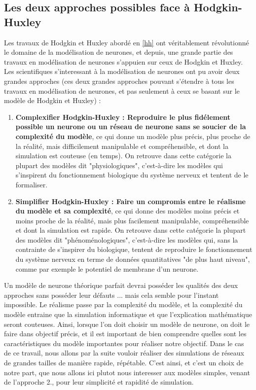 \documentclass[12pt]{scrartcl}
\begin{document}
\subsection{Les deux approches possibles face à Hodgkin-Huxley}
	Les travaux de Hodgkin et Huxley abordé en \ref{hh} ont véritablement révolutionné le domaine de la modélisation de neurones, et depuis, une grande partie des travaux en modélisation de neurones s'appuien sur ceux de Hodgkin et Huxley. Les scientifiques s'interessant  à la modélisation de neurones ont pu avoir deux grandes approches (ces deux grandes approches pouvant s'étendre à tous les travaux en modélisation de neurones, et pas seulement à ceux se basant sur le modèle de Hodgkin et Huxley) : 
		\begin{enumerate} \item \textbf{Complexifier Hodgkin-Huxley : Reproduire le plus fidélement possible un neurone ou un réseau de neurone sans se soucier de la complexité du modèle}, ce qui donne un modèle plus précis, plus proche de la réalité, mais difficilement manipulable et compréhensible, et dont la simulation est couteuse (en temps). On retrouve dans cette catégorie la plupart des modèles dit "physiologiques", c'est-à-dire les modèles qui s'inspirent du fonctionnement biologique du système nerveux et tentent de le formaliser.  
		\item \textbf{Simplifier Hodgkin-Huxley : Faire un compromis entre le réalisme du modèle et sa complexité}, ce qui donne des modèles moins précis et moins proche de la réalité, mais plus facilement manipulable, compréhensible et dont la simulation est rapide. On retrouve dans cette catégorie la plupart des modèles dit "phénoménologiques", c'est-à-dire les modèles qui, sans la contrainte de s'inspirer du biologique, tentent de reproduire le fonctionnement du système nerveux en terme de données quantitatives "de plus haut niveau", comme par exemple le potentiel de membrane d'un neurone. \end{enumerate}
Un modèle de neurone théorique parfait devrai posséder les qualités des deux approches sans posséder leur défauts ... mais cela semble pour l'instant impossible. Le réalisme passe par la complexité du modèle, et la complexité du modèle entraine que la simulation informatique et que l'explication mathématique seront couteuses. Ainsi, lorsque l'on doit choisir un modèle de neurone, on doit le faire dans objectif précis, et il est important de bien comprendre quelles sont les caractéristiques du modèle importantes pour réaliser notre objectif. Dans le cas de ce travail, nous allons par la suite vouloir réaliser des simulations de réseaux de grandes tailles de manière rapide, répétable. C'est ainsi, et c'est un choix de notre part, que nous allons ici plutot nous interesser aux modèles simples, venant de l'approche 2., pour leur simplicité et rapidité de simulation. 
\end{document}
